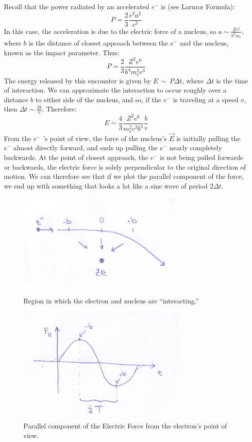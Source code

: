 \documentclass{article}
\def\ef{\vec E}
\def\ef{\vec E}
\begin{document}
Recall that the power radiated by an accelerated
$e^-$ is (see Larmor Formula):
$$P=\frac{2}{3}\frac{e^2a^2}{ c^3}$$
In this case, the acceleration is due to the electric force of a
nucleus, so $a\sim\frac{Ze^2}{ b^2m_e}$, where $b$ is the distance of
closest approach between the $e^-$ and the nucleus, known as the impact parameter.  Thus:
$$P=\frac{2}{3}\frac{Z^2e^6}{ b^4m_e^2c^3}$$
The energy released by this encounter is given by $E \,\sim\, P\Delta t$, where
$\Delta t$ is the time of interaction.  We can approximate the interaction to occur roughly over a distance $b$ to either side of the nucleus, and so, if the $e^-$ is traveling at a speed $v$, then
$\Delta t\sim\frac{2b}{ v}$.  Therefore:
$$E\sim\frac{4}{3}\frac{Z^2e^6}{ m_e^2c^3b^4}\frac{b}{ v}$$
From the $e^-$ 's point of view, the force of the nucleus's $\ef$ is initially pulling the $e^-$ almost directly forward, and ends up pulling
the $e^-$ nearly completely backwards.  At the point of closest approach, the $e^-$ is not being pulled forwards or backwards, the electric force is solely perpendicular to the original direction of motion. We can therefore see that if we plot the parallel component of the force, we end up with something that looks a lot like a sine wave of period $2\Delta t$.  
\begin{figure}
    \centering
    \includegraphics[width=0.75\textwidth]{800px-InteractionRange.jpg}
    \caption{Region in which the electron and nucleus are ``interacting.''}
    \label{fig:intRange}
\end{figure}
\begin{figure}
    \centering
    \includegraphics[width=0.75\textwidth]{800px-ParallelForce.jpg}
    \caption{Parallel component of the Electric Force from the electron’s point of view.}
    \label{fig:parforce}
\end{figure}
\end{document}
